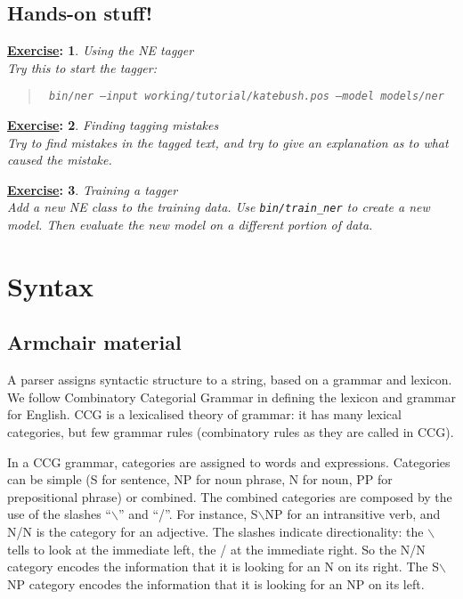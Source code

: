 \documentclass[11pt]{article}
\newtheorem{exercisebb}{\textbf{\underline{Exercise}:}}[section]
\newcommand{\bx}[1]{\begin{exercisebb} \rm #1\\}
\newcommand{\ex}{\end{exercisebb}}
\newcommand{\mnote}[1]
{
  \marginpar{\small #1}
  #1
}
\begin{document}

\clearpage
\subsection*{Hands-on stuff!}

\bx{Using the NE tagger}
Try this to start the tagger:

\begin{quote}\tt
bin/ner --input working/tutorial/katebush.pos --model models/ner
\end{quote}
\ex

\bx{Finding tagging mistakes}
Try to find mistakes in the tagged text, and try to give an explanation as to what caused the mistake.
\ex

\bx{Training a tagger}
Add a new NE class to the training data. Use \texttt{bin/train\_ner} to create a new model. Then evaluate the new model on a different portion of data.
\ex

%
%
\clearpage
\section{Syntax}\label{section:parser}

\subsection*{Armchair material}

A parser assigns syntactic structure to a string, based on a grammar
and lexicon.  We follow \mnote{Combinatory Categorial Grammar} in
defining the lexicon and grammar for English. CCG is a lexicalised
theory of grammar: it has many lexical categories, but few grammar
rules (combinatory rules as they are called in CCG). 

In a CCG grammar, categories are assigned to words and expressions.
Categories can be simple (S for sentence, NP for noun phrase, N for
noun, PP for prepositional phrase) or combined. The combined
categories are composed by the use of the slashes ``$\backslash$'' and
``/''.  For instance, S$\backslash$NP for an intransitive verb, and
N/N is the category for an adjective. The slashes indicate
directionality: the $\backslash$ tells to look at the immediate left,
the / at the immediate right. So the N/N category encodes the
information that it is looking for an N on its right. The
S$\backslash$NP category encodes the information that it is looking
for an NP on its left.
\end{document}
